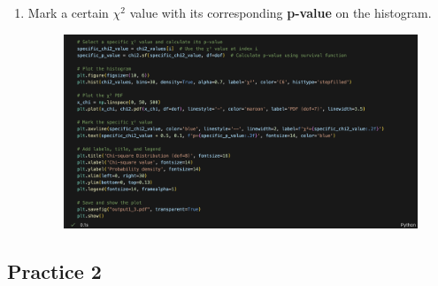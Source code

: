 \documentclass[12pt,a4paper]{article}
\begin{document}
\begin{CJK}{UTF8}{bkai}
\begin{enumerate}
\begin{figure}[h]
        \label{fig:code_1_5}
    \end{figure}
    \clearpage
    \item Mark a certain $\chi^2$ value with its corresponding \textbf{p-value} on the histogram.
    \begin{figure}[h]
        \centering
        \includegraphics[width=1\linewidth]{figures/code/practice_1/code_1_7.png}
        \label{fig:code_1_7}
    \end{figure}
\end{enumerate}

\subsection{Practice 2}
\hfill


\end{CJK}
\end{document}
